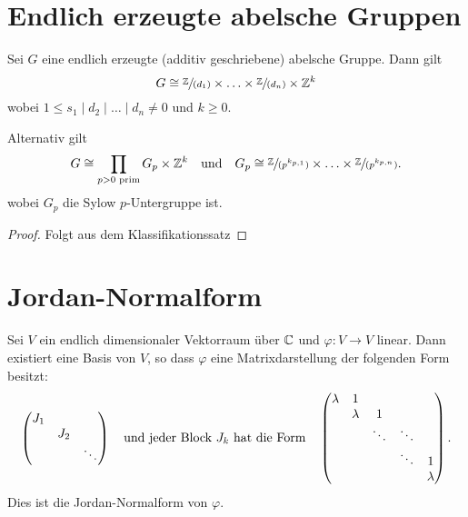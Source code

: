 \section{Endlich erzeugte abelsche Gruppen}
\begin{theorem}
	Sei $G$ eine endlich erzeugte (additiv geschriebene) abelsche Gruppe.
	Dann gilt
	\[
		G \cong \sfrac{\mathbb{Z}}{(d_1)} \times \ldots \times \sfrac{\mathbb{Z}}{(d_{n})} \times \mathbb{Z}^{k}
	\] 
	wobei $1 \leq s_1 \mid d_2 \mid \ldots \mid d_{n} \neq 0$ und $k \geq 0$.
	
	Alternativ gilt
	\[
		G \cong \prod_{p > 0 \text{ prim}} G_{p} \times \Z^{k} \qq{und} G_{p} \cong \sfrac{\Z}{(p^{k_{p,1}})} \times \ldots \times \sfrac{\Z}{(p^{k_{p,n}})}
	.\] 
	wobei $G_{p}$ die Sylow $p$-Untergruppe ist.
\end{theorem}

\begin{proof}
	Folgt aus dem Klassifikationssatz
\end{proof}

\section{Jordan-Normalform}
\begin{theorem}
	Sei $V$ ein endlich dimensionaler Vektorraum über $\mathbb{C}$ und $\varphi: V \to  V$ linear.
	Dann existiert eine Basis von $V$, so dass $\varphi$ eine Matrixdarstellung der folgenden Form besitzt:
	\[
	\begin{pmatrix} 
		J_1\\
		&J_2\\
		& & \ddots
	\end{pmatrix} \qq{und jeder Block $J_{k}$ hat die Form} \begin{pmatrix} 
		\lambda &1\\
		&\lambda &1\\
		& & \ddots &\ddots\\
		& & & \ddots &1\\
		& & & &\lambda
	\end{pmatrix} 
	.\]
	Dies ist die Jordan-Normalform von $\varphi$.
\end{theorem}

